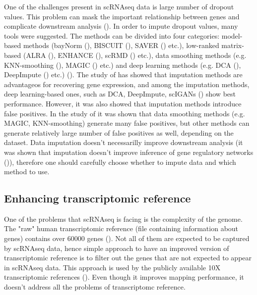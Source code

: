 One of the challenges present in scRNAseq data is large number of dropout values.
This problem can mask the important relationship between genes and complicate downstream analysis (\cite{Wang2022}).
In order to impute dropout values, many tools were suggested.
The methods can be divided into four categories:
model-based methods (bayNorm (\cite{Tang2019}), BISCUIT (\cite{Azizi2017}), SAVER (\cite{Huang2018}) etc.),
low-ranked matrix-based (ALRA (\cite{Linderman2022}), ENHANCE (\cite{Wagner2019}), scRMD (\cite{Chen2020}) etc.),
data smoothing methods (e.g. KNN-smoothing (\cite{Wagner2017}), MAGIC (\cite{Dijk2018}) etc.) and
deep learning methods (e.g. DCA (\cite{Eraslan2019}), DeepImpute (\cite{Arisdakessian2019}) etc.) (\cite{Wang2022}).
The study of \textcite{Dai2022} has showed that imputation methods are advantageos for recovering gene expression,
and among the imputation methods, deep learning-based ones,
such as DCA, DeepImpute, scIGANs (\cite{Xu2020}) show best performance.
However, it was also showed that imputation methods introduce false positives.
In the study of \textcite{Andrews2019} it was shown that data smoothing methods (e.g. MAGIC, KNN-smoothing)
generate many false positives, but other methods can generate relatively large number of false positives as well,
depending on the dataset.
Data imputation doesn't necessarilly improve downstream analysis
(it was shown that imputation doesn't improve inference of gene regulatory networks (\cite{McCalla2023})),
therefore one should carefully choose whether to impute data and which method to use.

\subsection{Enhancing transcriptomic reference}

One of the problems that scRNAseq is facing is the complexity of the genome.
The "raw" human transcriptomic reference (file containing information about genes)
contains over 60000 genes (\cite{Frankish2022}).
Not all of them are expected to be captured by scRNAseq data, hence simple approach
to have an improved version of transcriptomic reference is to filter out the genes
that are not expected to appear in scRNAseq data.
This approach is used by the publicly available 10X transcriptomic references (\cite{Zheng2017}).
Even though it improves mapping performance, it doesn't address all the problems of transcriptomc reference.

